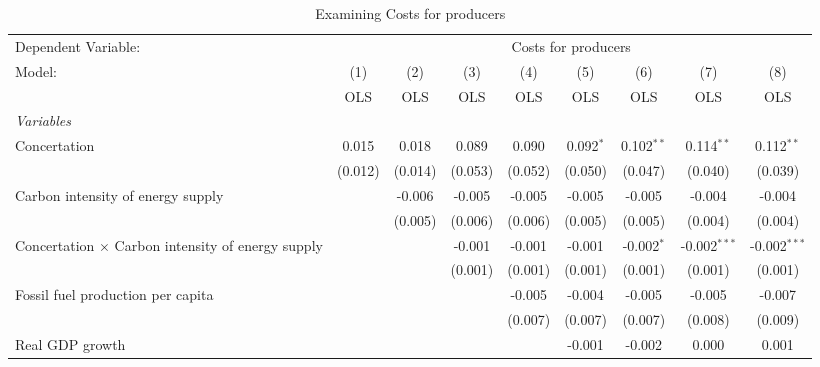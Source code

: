 
\begin{table}[htbp]
   \caption{Examining Costs for producers}
   \centering
   \begin{tabular}{lcccccccc}
      \toprule
      Dependent Variable: & \multicolumn{8}{c}{Costs for producers}\\
      Model:                                                   & (1)     & (2)     & (3)     & (4)     & (5)         & (6)          & (7)            & (8)\\  
                                                               &  OLS    & OLS     & OLS     & OLS     & OLS         & OLS          & OLS            & OLS\\  
      \midrule
      \emph{Variables}\\
      Concertation                                             & 0.015   & 0.018   & 0.089   & 0.090   & 0.092$^{*}$ & 0.102$^{**}$ & 0.114$^{**}$   & 0.112$^{**}$\\   
                                                               & (0.012) & (0.014) & (0.053) & (0.052) & (0.050)     & (0.047)      & (0.040)        & (0.039)\\   
      Carbon intensity of energy supply                        &         & -0.006  & -0.005  & -0.005  & -0.005      & -0.005       & -0.004         & -0.004\\   
                                                               &         & (0.005) & (0.006) & (0.006) & (0.005)     & (0.005)      & (0.004)        & (0.004)\\   
      Concertation $\times$ Carbon intensity of energy supply  &         &         & -0.001  & -0.001  & -0.001      & -0.002$^{*}$ & -0.002$^{***}$ & -0.002$^{***}$\\   
                                                               &         &         & (0.001) & (0.001) & (0.001)     & (0.001)      & (0.001)        & (0.001)\\   
      Fossil fuel production per capita                        &         &         &         & -0.005  & -0.004      & -0.005       & -0.005         & -0.007\\   
                                                               &         &         &         & (0.007) & (0.007)     & (0.007)      & (0.008)        & (0.009)\\   
      Real GDP growth                                          &         &         &         &         & -0.001      & -0.002       & 0.000          & 0.001\\   

\end{tabular}
\end{table}
